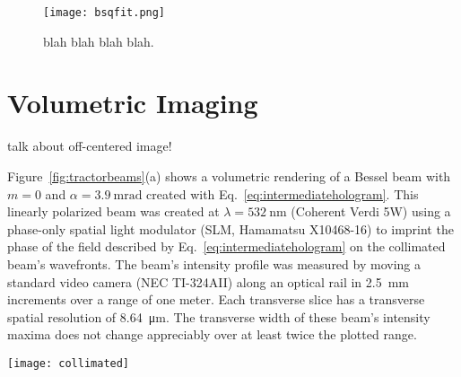 \begin{figure}[t!]
  \centering
  \texttt{[image: bsqfit.png]}
  \caption{blah blah blah blah.}
  \label{fig:bessel quality}
\end{figure}

\section{Volumetric Imaging}

talk about off-centered image!




Figure~\ref{fig:tractorbeams}(a) shows a volumetric
rendering of a Bessel beam with $m = 0$ and
$\alpha = \SI{3.9}{\milli\radian}$ created with
Eq.~\eqref{eq:intermediatehologram}.
This linearly polarized beam was created at $\lambda = \SI{532}{\nm}$
(Coherent Verdi 5W)
using a phase-only spatial light modulator (SLM, Hamamatsu X10468-16)
to imprint the phase of the field described by
Eq.~\eqref{eq:intermediatehologram}
on the collimated beam's wavefronts.
The beam's intensity profile was measured by
moving a standard
video camera (NEC TI-324AII) along an optical rail in \SI{2.5}{\mm}
increments over a range of one meter.
Each transverse slice has a transverse spatial resolution of \SI{8.64}{\um}.
The transverse width of these beam's intensity maxima does not change
appreciably over at least twice the plotted range.

\begin{figure*}[!t]
  \centering
  \texttt{[image: collimated]}
  \caption{Propagation-invariant modes projected with intermediate-plane
    holograms.  (a) Bessel beam, $m = 0$, $\alpha = \SI{3.9}{\milli\radian}$.
    (b) Optical conveyor,
    $m = 0$,
    $\alpha_1 = \SI{3.9}{\milli\radian}$,
    $\alpha_2 = \SI{8.8}{\milli\radian}$.
    (c) Solenoidal tractor beam,
    $m_1 = \num{-10}$,
    $m_2 = \num{-7}$,
    $\alpha_1 = \SI{6.4}{\milli\radian}$,
    $\alpha_2 = \SI{8.8}{\milli\radian}$.}
  \label{fig:tractorbeams}
\end{figure*}

